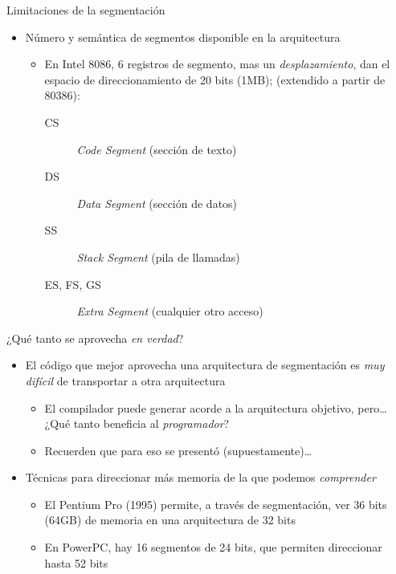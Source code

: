 \documentclass[presentation]{beamer}
\begin{document}
\begin{frame}[label={sec:org8660618}]{Limitaciones de la segmentación}
\begin{itemize}
\item Número y semántica de segmentos disponible en la arquitectura
\begin{itemize}
\item En Intel 8086, 6 registros de segmento, mas un \emph{desplazamiento},
dan el espacio de direccionamiento de 20 bits (1MB); (extendido a
partir de 80386):
\begin{description}
\item[{CS}] \emph{Code Segment} (sección de texto)
\item[{DS}] \emph{Data Segment} (sección de datos)
\item[{SS}] \emph{Stack Segment} (pila de llamadas)
\item[{ES, FS, GS}] \emph{Extra Segment} (cualquier otro acceso)
\end{description}
\end{itemize}
\end{itemize}
\end{frame}

\begin{frame}[label={sec:org9b7ac23}]{¿Qué tanto se aprovecha \emph{en verdad}?}
\begin{itemize}
\item El código que mejor aprovecha una arquitectura de segmentación es
\emph{muy difícil} de transportar a otra arquitectura
\begin{itemize}
\item El compilador puede generar acorde a la arquitectura objetivo,
pero\ldots{} ¿Qué tanto beneficia al \emph{programador}?
\item Recuerden que para eso se presentó (supuestamente)\ldots{}
\end{itemize}
\item Técnicas para direccionar más memoria de la que podemos \emph{comprender}
\begin{itemize}
\item El Pentium Pro (1995) permite, a través de segmentación, ver 36
bits (64GB) de memoria en una arquitectura de 32 bits
\item En PowerPC, hay 16 segmentos de 24 bits, que permiten direccionar
hasta 52 bits
\end{itemize}
\end{itemize}
\end{frame}
\end{document}
